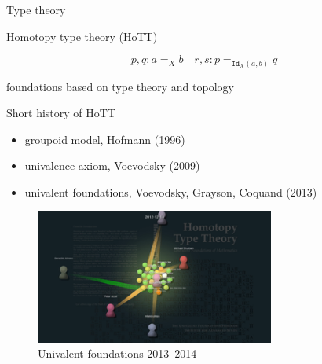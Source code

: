 \documentclass[english]{beamer}
\begin{document}
\begin{frame}{Type theory}

\end{frame}

\begin{frame}{Homotopy type theory (HoTT)}

\centering
$$ p,q : a =_X b \quad r,s : p =_{\texttt{Id}_X(a,b)} q$$ 




foundations based on type theory and topology

\end{frame}

\begin{frame}{Short history of HoTT }

\begin{itemize}
 \item groupoid model, Hofmann  (1996)
 \item univalence axiom, Voevodsky (2009)
 \item univalent foundations, Voevodsky, Grayson, Coquand (2013)
\end{itemize}

\begin{figure}[h!]
\centering    
\includegraphics[width=0.7\textwidth]{figures/HoTT-pic.png}
  \caption{Univalent foundations 2013--2014}
 \end{figure} 


\end{frame}
\end{document}
